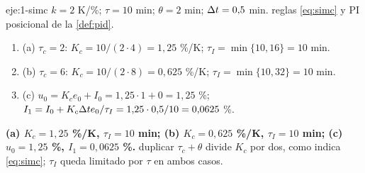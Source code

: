 \begin{solucion}{eje:1-simc}
\datos $k=2$ K/\%; $\tau=10$ min; $\theta=2$ min; $\Delta t=0{,}5$ min.
\planteamiento reglas \eqref{eq:simc} y PI posicional de la \cref{def:pid}.
\pasos
\begin{enumerate}[label=\arabic*.]
  \item (a) $\tau_c=2$: $K_c=10/(2\cdot4)=1{,}25$ \%/K; $\tau_I=\min\{10,16\}=10$ min.
  \item (b) $\tau_c=6$: $K_c=10/(2\cdot8)=0{,}625$ \%/K; $\tau_I=\min\{10,32\}=10$ min.
  \item (c) $u_0=K_ce_0+I_0=1{,}25\cdot1+0=1{,}25$ \%; $I_1=I_0+K_c\Delta t e_0/\tau_I=1{,}25\cdot0{,}5/10=0{,}0625$ \%.
\end{enumerate}
\resultado \textbf{(a) $K_c=1{,}25$ \%/K, $\tau_I=10$ min; (b) $K_c=0{,}625$ \%/K, $\tau_I=10$ min; (c) $u_0=1{,}25$ \%, $I_1=0{,}0625$ \%.}
\comprobacion duplicar $\tau_c+\theta$ divide $K_c$ por dos, como indica \eqref{eq:simc}; $\tau_I$ queda limitado por $\tau$ en ambos casos.
\end{solucion}

